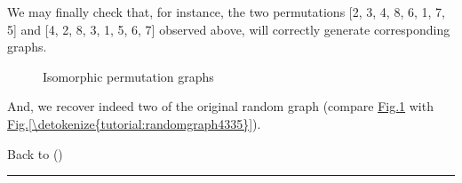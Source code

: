 \documentclass[a4paper,12pt,english]{sphinxhowto}
\let\sphinxpxdimen\pdfpxdimen\else\newdimen\sphinxpxdimen
\begin{document}
We may finally check that, for instance, the two permutations {[}2, 3, 4, 8, 6, 1, 7, 5{]} and {[}4, 2, 8, 3, 1, 5, 6, 7{]} observed above, will correctly generate corresponding  graphs.

\begin{sphinxVerbatim}[commandchars=\\\{\},numbers=left,firstnumber=1,stepnumber=1]
  \PYG{p}{[}       \PYG{p}{]}
  \PYG{p}{[}       \PYG{p}{]}
\end{sphinxVerbatim}

\begin{figure}[H]
\centering
\capstart

\noindent\sphinxincludegraphics[width=700\sphinxpxdimen]{{isomorphicPerms}.png}
\caption{Isomorphic permutation graphs}\label{\detokenize{tutorial:isomorphicpermgraphs}}\end{figure}

And, we recover indeed two  of the original random graph (compare \hyperref[\detokenize{tutorial:isomorphicpermgraphs}]{Fig.\@ \ref{\detokenize{tutorial:isomorphicpermgraphs}}} with \hyperref[\detokenize{tutorial:randomgraph4335}]{Fig.\@ \ref{\detokenize{tutorial:randomgraph4335}}}).

Back to {\hyperref[\detokenize{tutorial:tutorial-label}]{}} ()


\bigskip\hrule\bigskip
\end{document}
